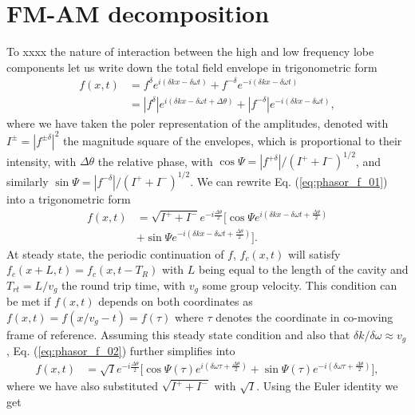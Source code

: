 \documentclass[10pt,letterpaper]{article}
\def\dw{\delta\omega}
\def\dth{\Delta\theta}
\def\dk{\delta k}
\begin{document}
	
\section{FM-AM decomposition}
To xxxx the nature of interaction between the high and low frequency lobe components let us write down the total field envelope in trigonometric form
\begin{align}
	f(x,t) &= f^{\delta} e^{i(\dk x -\dw t)} +  f^{-\delta} e^{-i(\dk x -\dw t)} \nonumber \\
		 & = |f^{\delta}|e^{i(\dk x -\dw t + \dth )} + |f^{-\delta}|e^{-i(\dk x -\dw  t)}, \label{eq:phasor_f_01}
\end{align}
where we have taken the poler representation of the amplitudes, denoted with $I^{\pm} = |f^{\pm\delta}|^2$ the magnitude square of the envelopes, which is proportional to their intensity, with $\Delta \theta$ the relative phase, with $\cos\Psi = |f^{+\delta}|/\left( I^+ + I^-\right)^{1/2}$, and similarly  $\sin\Psi = |f^{-\delta}|/\left( I^{+}+I^{-}\right)^{1/2}$.  We can rewrite Eq. (\ref{eq:phasor_f_01}) into a trigonometric form
\begin{align}
	f(x,t) &= \sqrt{I^+ + I^{-}} e^{-i\frac{\dth}{2}} \Big [\cos\Psi e^{i(\dk x -\dw t + \frac{\dth}{2})} \nonumber \\ 
		   & +  \sin\Psi e^{-i(\dk x -\dw t + \frac{\dth}{2})}\Big ]. \label{eq:phasor_f_02}
\end{align}
At steady state, the periodic continuation of $f$, $f_c(x,t)$ will satisfy $f_c(x+L,t) = f_c(x,t-T_R)$ with $L$ being equal to the length of the cavity and $T_{rt} = L/v_g$ the round trip time, with $v_g$ some group velocity. This condition can be met if $f(x,t)$ depends on both coordinates as $f(x,t) = f(x/v_g-t) = f(\tau)$ where $\tau$ denotes the coordinate in co-moving frame of reference. Assuming this steady state condition and also that $\dk / \dw \approx v_g$, Eq. (\ref{eq:phasor_f_02}) further simplifies into 
\begin{align}
f(x,t) &= \sqrt{I} e^{-i\frac{\dth}{2}} \Big [\cos\Psi(\tau) e^{i(\dw\tau + \frac{\dth}{2})} +  \sin\Psi(\tau) e^{-i(\dw\tau + \frac{\dth}{2})}\Big ], \label{eq:phasor_f_03}
\end{align}
where we have also substituted $\sqrt{I^+ + I^{-}}$ with  $\sqrt{I}$. 
Using the Euler identity we get
\end{document}
